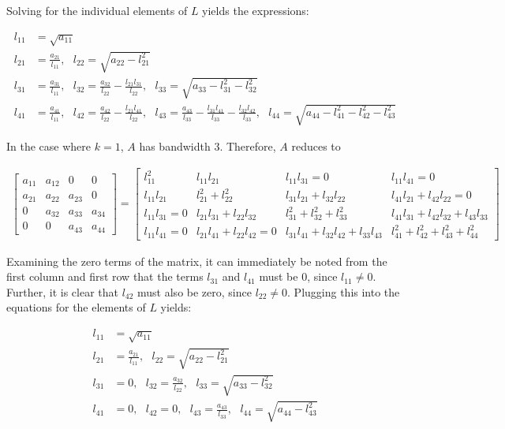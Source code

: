 \documentclass{article}
\begin{document}
		Solving for the individual elements of $L$ yields the expressions:
		
		\begin{align*}
		l_{11}&=\sqrt{a_{11}}\\
		l_{21}&=\frac{a_{21}}{l_{11}},\text{ }l_{22}=\sqrt{a_{22}-l_{21}^2}\\
		l_{31}&=\frac{a_{31}}{l_{11}},\text{ }l_{32}=\frac{a_{32}}{l_{22}}-\frac{l_{21}l_{31}}{l_{22}},\text{ }l_{33}=\sqrt{a_{33}-l_{31}^{2}-l_{32}^2}\\
		l_{41}&=\frac{a_{41}}{l_{11}},\text{ }l_{42}=\frac{a_{42}}{l_{22}}-\frac{l_{21}l_{41}}{l_{22}},\text{ }l_{43}=\frac{a_{43}}{l_{33}}-\frac{l_{31}l_{41}}{l_{33}}-\frac{l_{32}l_{42}}{l_{33}},\text{ }l_{44}=\sqrt{a_{44}-l_{41}^{2}-l_{42}^{2}-l_{43}^{2}}
		\end{align*}
		
		In the case where $k=1$, $A$ has bandwidth $3$.  Therefore, $A$ reduces to 
		
		\begin{align*}
			\begin{bmatrix}
			a_{11} & a_{12} & 0 & 0 \\
			a_{21} & a_{22} & a_{23} & 0  \\
			0 & a_{32} & a_{33} & a_{34} \\
			0  & 0 & a_{43} & a_{44}
			\end{bmatrix}=
			\begin{bmatrix}
			l_{11}^{2} & l_{11}l_{21} & l_{11}l_{31}=0 & l_{11}l_{41}=0 \\
			l_{11}l_{21} & l_{21}^{2}+l_{22}^{2} & l_{31}l_{21}+l_{32}l_{22} & l_{41}l_{21}+l_{42}l_{22}=0\\
			l_{11}l_{31}=0 & l_{21}l_{31}+l_{22}l_{32} & l_{31}^{2}+l_{32}^{2}+l_{33}^{2} & l_{41}l_{31}+l_{42}l_{32}+l_{43}l_{33} \\
			l_{11}l_{41}=0 & l_{21}l_{41}+l_{22}l_{42}=0 & l_{31}l_{41}+l_{32}l_{42}+l_{33}l_{43} & l_{41}^{2}+l_{42}^{2}+l_{43}^{2}+l_{44}^{2}
			\end{bmatrix}
		\end{align*}
		
		Examining the zero terms of the matrix, it can immediately be noted from the first column and first row that the terms $l_{31}$ and $l_{41}$ must be $0$, since $l_{11}\neq0$.  Further, it is clear that $l_{42}$ must also be zero, since $l_{22}\neq0$.  Plugging this into the equations for the elements of $L$ yields:
		
		\begin{align*}
			l_{11}&=\sqrt{a_{11}}\\
			l_{21}&=\frac{a_{21}}{l_{11}},\text{ }l_{22}=\sqrt{a_{22}-l_{21}^2}\\
			l_{31}&=0,\text{ }l_{32}=\frac{a_{32}}{l_{22}},\text{ }l_{33}=\sqrt{a_{33}-l_{32}^2}\\
			l_{41}&=0,\text{ }l_{42}=0,\text{ }l_{43}=\frac{a_{43}}{l_{33}},\text{ }l_{44}=\sqrt{a_{44}-l_{43}^{2}}
		\end{align*} 
		
\end{document}
